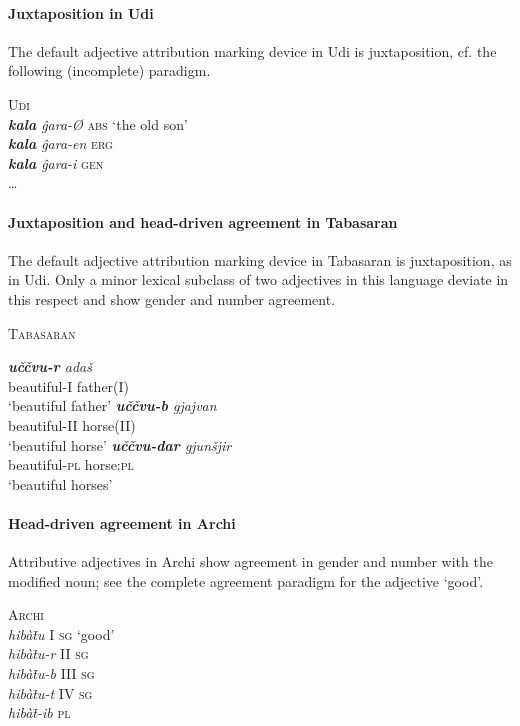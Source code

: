 \paragraph{Juxtaposition in Udi}
The default adjective attribution marking device in Udi is juxtaposition, cf. the following (incomplete) paradigm.
\begin{exe}
\ex \textsc{Udi} \citep[465]{schulze-furhoff1994}\\
\textit{\textbf{kala} ĝara-Ø} \textsc{abs} ‘the old son’\\
\textit{\textbf{kala} ĝara-en} \textsc{erg}\\
\textit{\textbf{kala} ĝara-i} \textsc{gen}\\
\dots
\end{exe}

\paragraph{Juxtaposition and head-driven agreement in Tabasaran}
The default adjective attribution marking device in Tabasaran is juxtaposition, as in Udi. Only a minor lexical subclass of two adjectives in this language deviate in this respect and show gender and number agreement.
\begin{exe}
\ex \textsc{Tabasaran} \citep[50–51]{kurbanov1986}
\begin{xlist}
\ex 
\gll \textit{\textbf{uččvu-r} adaš}\\
	beautiful-\textsc{I} father\textsc{(I)}\\
\glt	‘beautiful father’
\ex 
\gll \textit{\textbf{uččvu-b} gjajvan}\\
	beautiful-\textsc{II} horse\textsc{(II)}\\
\glt	‘beautiful horse’
\ex
\gll \textit{\textbf{uččvu-dar} gjunšjir}\\
	beautiful-\textsc{pl} horse:\textsc{pl}\\
\glt	‘beautiful horses’
\end{xlist}
\end{exe}

\paragraph{Head-driven agreement in Archi}
Attributive adjectives in Archi show agreement in gender and number with the modified noun; see the complete agreement paradigm for the adjective ‘good’.
\begin{exe}
\ex \textsc{Archi} \citep{kibrik1994a}\\
\textit{hibàt̄u} \textsc{I sg} ‘good’\\
\textit{hibàt̄u-r} \textsc{II sg}\\
\textit{hibàt̄u-b} \textsc{III sg}\\
\textit{hibàt̄u-t} \textsc{IV sg}\\
\textit{hibàt̄-ib} \textsc{pl}
\end{exe}

